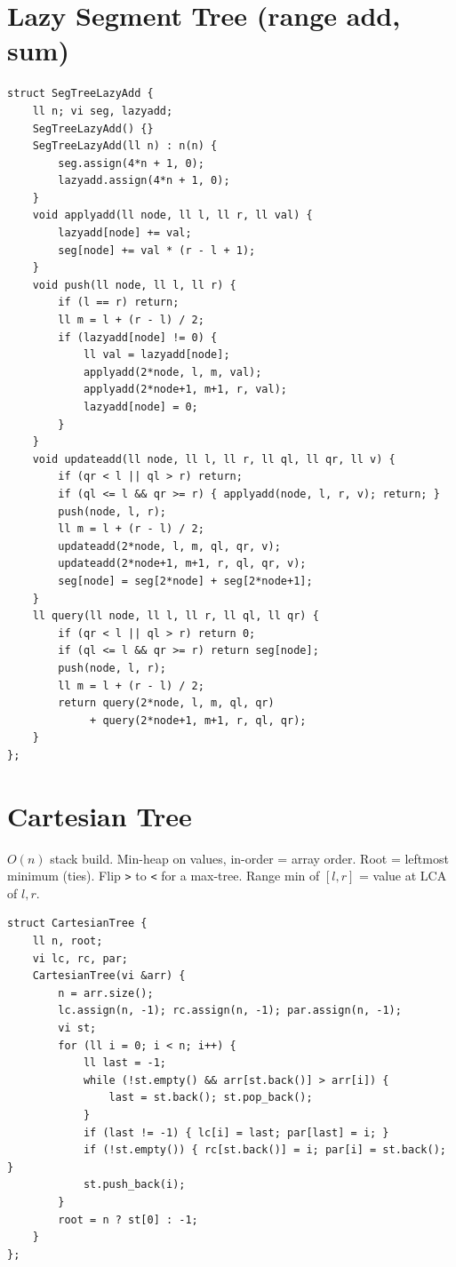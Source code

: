 \documentclass[10pt]{article}
\newcommand{\note}[1]{{\scriptsize #1}\par}
\begin{document}
\begin{multicols*}{3}
\section{Lazy Segment Tree (range add, sum)}
\begin{lstlisting}
struct SegTreeLazyAdd {
    ll n; vi seg, lazyadd;
    SegTreeLazyAdd() {}
    SegTreeLazyAdd(ll n) : n(n) {
        seg.assign(4*n + 1, 0);
        lazyadd.assign(4*n + 1, 0);
    }
    void applyadd(ll node, ll l, ll r, ll val) {
        lazyadd[node] += val;
        seg[node] += val * (r - l + 1);
    }
    void push(ll node, ll l, ll r) {
        if (l == r) return;
        ll m = l + (r - l) / 2;
        if (lazyadd[node] != 0) {
            ll val = lazyadd[node];
            applyadd(2*node, l, m, val);
            applyadd(2*node+1, m+1, r, val);
            lazyadd[node] = 0;
        }
    }
    void updateadd(ll node, ll l, ll r, ll ql, ll qr, ll v) {
        if (qr < l || ql > r) return;
        if (ql <= l && qr >= r) { applyadd(node, l, r, v); return; }
        push(node, l, r);
        ll m = l + (r - l) / 2;
        updateadd(2*node, l, m, ql, qr, v);
        updateadd(2*node+1, m+1, r, ql, qr, v);
        seg[node] = seg[2*node] + seg[2*node+1];
    }
    ll query(ll node, ll l, ll r, ll ql, ll qr) {
        if (qr < l || ql > r) return 0;
        if (ql <= l && qr >= r) return seg[node];
        push(node, l, r);
        ll m = l + (r - l) / 2;
        return query(2*node, l, m, ql, qr)
             + query(2*node+1, m+1, r, ql, qr);
    }
};
\end{lstlisting}

\section{Cartesian Tree}
\note{$O(n)$ stack build. Min-heap on values, in-order = array order. Root = leftmost minimum (ties). Flip \texttt{>} to \texttt{<} for a max-tree. Range min of $[l,r]$ = value at LCA of $l,r$.}
\begin{lstlisting}
struct CartesianTree {
    ll n, root;
    vi lc, rc, par;
    CartesianTree(vi &arr) {
        n = arr.size();
        lc.assign(n, -1); rc.assign(n, -1); par.assign(n, -1);
        vi st;
        for (ll i = 0; i < n; i++) {
            ll last = -1;
            while (!st.empty() && arr[st.back()] > arr[i]) {
                last = st.back(); st.pop_back();
            }
            if (last != -1) { lc[i] = last; par[last] = i; }
            if (!st.empty()) { rc[st.back()] = i; par[i] = st.back(); }
            st.push_back(i);
        }
        root = n ? st[0] : -1;
    }
};
\end{lstlisting}


\end{multicols*}
\end{document}
